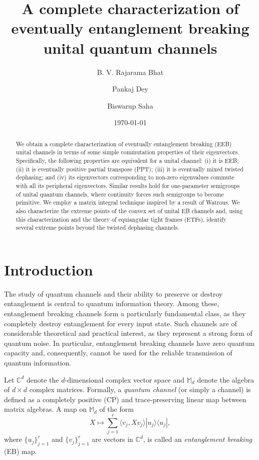 \documentclass[11pt,reqno]{amsart}
\title[Eventually Entanglement Breaking Channels]{A complete characterization of  eventually entanglement breaking unital quantum channels}
\author{B. V. Rajarama Bhat}
\author{Pankaj Dey}
\author{Biswarup Saha}
\theoremstyle{definition}
\theoremstyle{plain}
\theoremstyle{remark}
\numberwithin{equation}{section}%
\begin{document}

\begin{abstract}


We obtain a complete characterization of eventually entanglement breaking (EEB)  unital channels in terms of some simple commutation properties of their  eigenvectors. Specifically, the following properties are equivalent for a unital channel: (i) it is EEB; (ii) it is eventually positive partial transpose (PPT); (iii) it is eventually mixed twisted dephasing; and (iv) its eigenvectors corresponding to non-zero eigenvalues commute with all its peripheral eigenvectors. Similar results hold for one-parameter semigroups of unital quantum channels, where continuity forces such semigroups to become primitive.   We employ a matrix integral technique inspired by a result of Watrous. We also characterize the extreme points of the convex set of unital EB channels and, using this characterization and the theory of equiangular tight frames (ETFs), identify several extreme points beyond the twisted dephasing channels.
\end{abstract}


\date{\today}




\maketitle




\section{Introduction}

The study of quantum channels and their ability to preserve or destroy entanglement is central to quantum information theory. Among these, entanglement breaking channels form a particularly fundamental class, as they completely destroy entanglement for every input state. Such channels are of considerable theoretical and practical interest, as they represent a strong form of quantum noise. In particular, entanglement breaking channels have zero quantum capacity and, consequently, cannot be used for the reliable transmission of quantum information. 


Let $\mathbb{C}^d$ denote the $d$-dimensional complex vector space and $\mathbb{M}_d$ denote the algebra of $d\times d$ complex matrices. Formally, a \textit{quantum channel} (or simply a channel) is defined as a completely positive (CP) and trace-preserving linear map between matrix algebras. A map on $\mathbb{M}_d$ of the form \[X\mapsto\sum\limits_{j=1}^r \langle v_j,Xv_j\rangle|u_j\rangle\langle u_j|,\]
where $\{u_j\}_{j=1}^r$ and $\{v_j\}_{j=1}^r$ are vectors in $\mathbb{C}^d$, is called an \textit{entanglement breaking} (EB) map.
\end{document}
